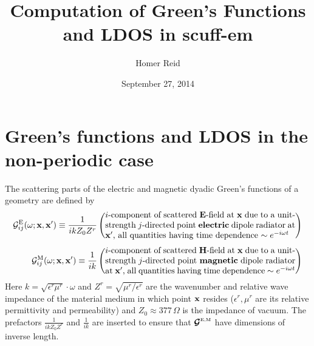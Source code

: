 \documentclass[letterpaper]{article}
\title {Computation of Green's Functions and LDOS in {\sc scuff-em}}
\author {Homer Reid}
\date {September 27, 2014}
\begin{document}
\pagestyle{myheadings}
\maketitle

\tableofcontents

\newpage
\section{Green's functions and LDOS in the non-periodic case}

The scattering parts of the electric and magnetic
dyadic Green's functions of a geometry are defined by
\begin{align*}
 \mc G_{ij}\sups{E}(\omega; \vb x, \vb x^\prime)
   \equiv
   \frac{1}{ikZ_0 Z^r}
  &\left( \parbox{0.65\textwidth}
    { $i$-component of scattered $\vb E$-field at $\vb x$
      due to a unit-strength $j$-directed point \textbf{electric} 
      dipole radiator
      at $\vb x^\prime$, all quantities having time dependence
      $\sim e^{-i\omega t}$
    }
   \right)
\\[5pt]
 \mc G_{ij}\sups{M}(\omega; \vb x, \vb x^\prime)
   \equiv
   \frac{1}{ik}
  &\left( \parbox{0.65\textwidth}
    { $i$-component of scattered $\vb H$-field at $\vb x$
      due to a unit-strength $j$-directed point \textbf{magnetic}
      dipole radiator
      at $\vb x^\prime$, all quantities having time dependence
      $\sim e^{-i\omega t}$
    }
   \right)
\end{align*}
Here $k=\sqrt{\epsilon^r \mu^r }\cdot \omega$ and 
$Z^r=\sqrt{\mu^r /\epsilon^r }$ are the wavenumber and 
relative wave impedance of the material medium in which 
point $\mathbf{x}$ resides ($\epsilon^r ,\mu^r$ are its relative 
permittivity and permeability) and $Z_0\approx 377\,\Omega$  
is the impedance of vacuum. The prefactors 
$\frac{1}{ikZ_0Z^r}$ and $\frac{1}{ik}$ are inserted to 
ensure that $\boldsymbol{\mathcal{G}}^{\hbox{\tiny{E,M}}}$ have dimensions of inverse
length.
\end{document}
